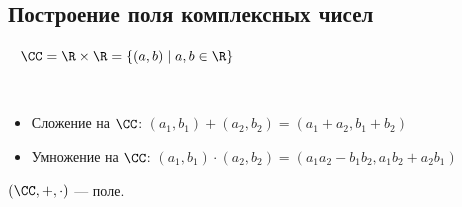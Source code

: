 \subsection{Построение поля комплексных чисел}

\begin{defn}~
    $\CC = \R \times \R = \{(a, b) \mid a, b \in \R\}$
\end{defn}

\begin{defn} \
    \begin{itemize}
        \item Сложение на $\CC$: $(a_1, b_1) + (a_2, b_2) = (a_1 + a_2, b_1 + b_2)$
        
        \item Умножение на $\CC$: $(a_1, b_1) \cdot (a_2, b_2) = (a_1a_2 - b_1b_2, a_1b_2 + a_2b_1)$
    \end{itemize}
\end{defn}

\begin{theorem-non}
    $(\CC, +, \cdot)$ --- поле.
\end{theorem-non}

